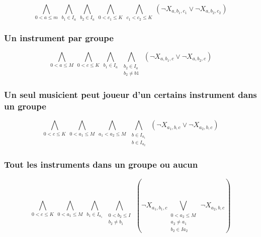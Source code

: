 \documentclass[11pt]{article}
\begin{document}
$$\bigwedge\limits_{0<a\le m}\ \bigwedge\limits_{b_1\in I_a}\ \bigwedge\limits_{b_2\in I_a}\ \bigwedge\limits_{0<c_1\le K}\ \bigwedge\limits_{c_1<c_2\le K}\ \left(\neg X_{a,b_1,c_1} \vee \neg X_{a,b_2,c_2}\right)$$

\subsubsection{Un instrument par groupe}


$$\bigwedge\limits_{0<a\le M}\ \bigwedge\limits_{0<c\le K}\ \bigwedge\limits_{b_1\in I_a}\ \bigwedge\limits_{\substack{b_2\in I_a \\ b_2 \ne b1}}\ \left(\neg X_{a,b_1,c} \vee \neg X_{a,b_2,c}\right)$$

\subsubsection{Un seul musicient peut joueur d'un certains instrument dans un groupe}


$$\bigwedge\limits_{0<c\le K}\ \bigwedge\limits_{0<a_1\le M}\ \bigwedge\limits_{a_1<a_2\le M}\ \bigwedge\limits_{\substack{b\in I_{a_1} \\ b\in I_{a_2}}}\ \left(\neg X_{a_1,b,c} \vee \neg X_{a_2,b,c}\right)$$

\subsubsection{Tout les instruments dans un groupe ou aucun}


$$\bigwedge\limits_{0<c\le K}\ \bigwedge\limits_{0<a_1\le M}\ \bigwedge\limits_{b_1\in I_{a_1}}\ \bigwedge\limits_{\substack{0<b_2\le I \\ b_2 \ne b_1}}\ \left(\neg X_{a_1,b_1,c} \bigvee\limits_{\substack{0<a_2\le M \\ a_2 \ne a_1 \\ b_2 \in I{a_2}}}\ \neg X_{a_2,b,c}\right)$$
\end{document}
